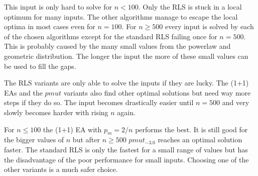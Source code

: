 

This input is only hard to solve for $n<100$.
Only the RLS is stuck in a local optimum for many inputs.
The other algorithms manage to escape the local optima in most cases even for $n=100$.
For $n\ge500$ every input is solved by each of the chosen algorithms except for the standard RLS failing once for $n=500$.
This is probably caused by the many small values from the powerlaw and geometric distribution.
The longer the input the more of these small values can be used to fill the gaps.



The RLS variants are only able to solve the inputs if they are lucky.
The (1+1) EAs and the $pmut$ variants also find other optimal solutions but need way more steps if they do so.
The input becomes drastically easier until $n=500$ and very slowly becomes harder with rising $n$ again.



For $n\le100$ the (1+1) EA with $p_m=2/n$ performs the best.
It is still good for the bigger values of $n$ but after $n\ge500$ $pmut_{-3.0}$ reaches an optimal solution faster.
The standard RLS is only the fastest for a small range of values but has the disadvantage of the poor performance for small inputs.
Choosing one of the other variants is a much safer choice.
